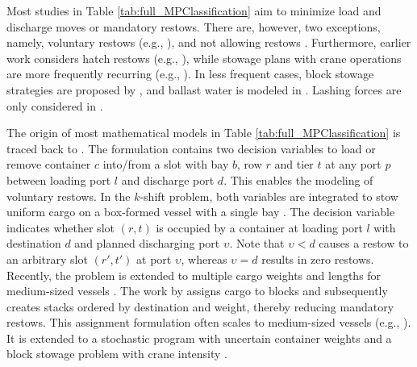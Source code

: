 \documentclass[preprint,12pt,authoryear]{elsarticle}
\begin{document}
Most studies in Table \ref{tab:full_MPClassification} aim to minimize load and discharge moves or mandatory restows. There are, however, two exceptions, namely, voluntary restows (e.g., \cite{Avriel1998StowageShifts, Ding2015StowageShifts, Roberti2018APlans}), and not allowing restows  \citep{Li2018Multi-PortUncertainties, Roberti2018APlans, Pacino2018CranePlanning}. Furthermore, earlier work considers hatch restows (e.g., \cite{Shields1984, Kang2002StowageTransportation, Pacino2011FastVessels}), while stowage plans with crane operations are more frequently recurring (e.g., \cite{Hamedi2011CONTAINERSHIPOPERATIONS, Azevedo2018SolvingAlgorithm, Chang2022SolvingMode}). In less frequent cases, block stowage strategies are proposed by \cite{Wilson2000ContainerSolutions, Liu2011RandomizedPlans, Pacino2018CranePlanning}, and ballast water is modeled in \cite{Shields1984, Botter1992StowageSolution}. Lashing forces are only considered in \cite{Shields1984}.

The origin of most mathematical models in Table \ref{tab:full_MPClassification} is traced back to \cite{Botter1992StowageSolution}. The formulation contains two decision variables to load or remove container $c$ into/from a slot with bay $b$, row $r$ and tier $t$ at any port $p$ between loading port $l$ and discharge port $d$. This enables the modeling of voluntary restows. 
In the $k$-shift problem, both variables are integrated to stow uniform cargo on a box-formed vessel with a single bay \citep{AvrielMordecaiPenn1993, Avriel1998StowageShifts}. The decision variable indicates whether slot $(r,t)$ is occupied by a container at loading port $l$ with destination $d$ and planned discharging port $\upsilon$. Note that $\upsilon<d$ causes a restow to an arbitrary slot $(r',t')$ at port $\upsilon$, whereas $\upsilon=d$ results in zero restows. Recently, the problem is extended to multiple cargo weights and lengths for medium-sized vessels \citep{Parreno-Torres2020ImprovingProblems, Parreno-Torres2021SolvingAlgorithm}.
The work by \cite{Kang2002StowageTransportation} assigns cargo to blocks and subsequently creates stacks ordered by destination and weight, thereby reducing mandatory restows. This assignment formulation often scales to medium-sized vessels (e.g., \cite{Kaisar2006ATRANSPORTATION, Hamedi2011CONTAINERSHIPOPERATIONS, Pacino2011FastVessels}). It is extended to a stochastic program with uncertain container weights \citep{Li2018Multi-PortUncertainties} and a block stowage problem with crane intensity \citep{Pacino2018CranePlanning}.
\end{document}
